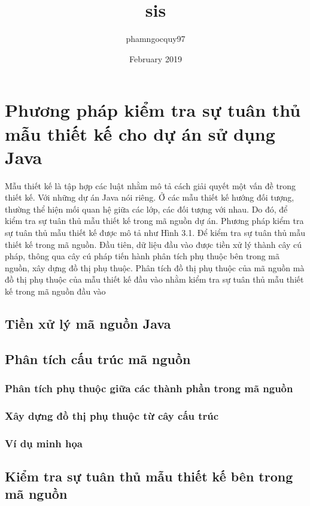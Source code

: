 \documentclass[12pt]{report}
\title{sis}
\author{phamngocquy97 }
\date{February 2019}
\begin{document}
	
\newpage
{}
\setcounter{page}{1}
\chapter{Phương pháp kiểm tra sự tuân thủ mẫu thiết kế cho dự án sử dụng Java}
Mẫu thiết kế là tập hợp các luật nhằm mô tả cách giải quyết một vấn đề trong thiết kế. Với những dự án Java nói riêng. Ở các mẫu thiết kế hướng đối tượng, thường thể hiện mối quan hệ giữa các lớp, các đối tượng với nhau. Do đó, để kiểm tra sự tuân thủ mẫu thiết kế trong mã nguồn dự án.
Phương pháp kiểm tra sự tuân thủ mẫu thiết kế được mô tả như Hình 3.1. Để kiểm tra sự tuân thủ mẫu thiết kế trong mã nguồn. Đầu tiên, dữ liệu đầu vào được tiền xử lý thành cây cú pháp, thông qua cây cú pháp tiến hành phân tích phụ thuộc bên trong mã nguồn, xây dựng đồ thị phụ thuộc. Phân tích đồ thị phụ thuộc của mã nguồn mà đồ thị phụ thuộc của mẫu thiết kế đầu vào nhằm kiểm tra sự tuân thủ mẫu thiết kế trong mã nguồn đầu vào
\section{Tiền xử lý mã nguồn Java}

\newpage
\section{Phân tích cấu trúc mã nguồn}
\subsection{Phân tích phụ thuộc giữa các thành phần trong mã nguồn}
\subsection{Xây dựng đồ thị phụ thuộc từ cây cấu trúc}
\subsection{Ví dụ minh họa}

\newpage
\section{Kiểm tra sự tuân thủ mẫu thiết kế bên trong mã nguồn}



\end{document}
